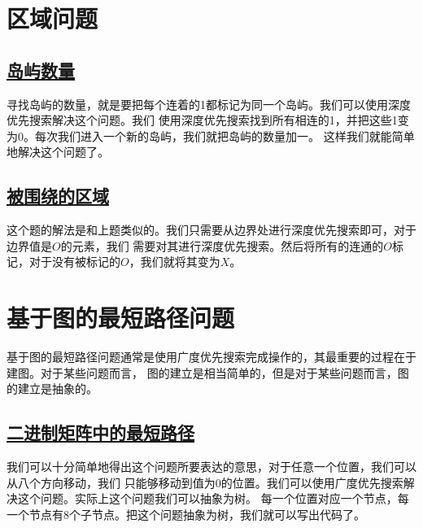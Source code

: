\documentclass[../../main.tex]{subfiles}
\begin{document}


\section{区域问题}

\subsection{\href{https://leetcode.cn/problems/number-of-islands/}{岛屿数量}}

寻找岛屿的数量，就是要把每个连着的1都标记为同一个岛屿。我们可以使用深度优先搜索解决这个问题。我们
使用深度优先搜索找到所有相连的1，并把这些1变为0。每次我们进入一个新的岛屿，我们就把岛屿的数量加一。
这样我们就能简单地解决这个问题了。



\subsection{\href{https://leetcode.cn/problems/surrounded-regions/}{被围绕的区域}}

这个题的解法是和上题类似的。我们只需要从边界处进行深度优先搜索即可，对于边界值是$O$的元素，我们
需要对其进行深度优先搜索。然后将所有的连通的$O$标记，对于没有被标记的$O$，我们就将其变为$X$。



\section{基于图的最短路径问题}

基于图的最短路径问题通常是使用广度优先搜索完成操作的，其最重要的过程在于建图。对于某些问题而言，
图的建立是相当简单的，但是对于某些问题而言，图的建立是抽象的。

\subsection{\href{https://leetcode.cn/problems/shortest-path-in-binary-matrix}{二进制矩阵中的最短路径
}}

我们可以十分简单地得出这个问题所要表达的意思，对于任意一个位置，我们可以从八个方向移动，我们
只能够移动到值为0的位置。我们可以使用广度优先搜索解决这个问题。实际上这个问题我们可以抽象为树。
每一个位置对应一个节点，每一个节点有8个子节点。把这个问题抽象为树，我们就可以写出代码了。
\end{document}
